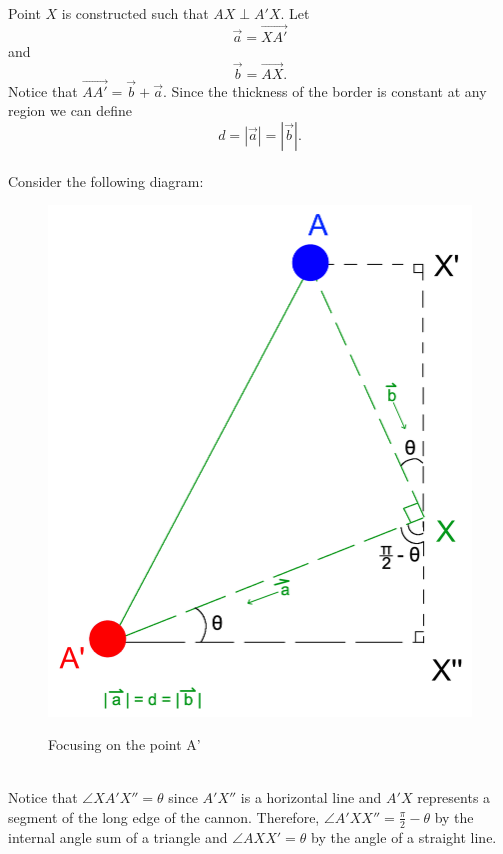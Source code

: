 \documentclass{article}
\begin{document}
Point $X$ is constructed such that $AX \perp A'X$. Let $$\vec{a} = \overrightarrow{XA'}$$ and $$\vec{b} = \overrightarrow{AX}.$$ Notice that $\overrightarrow{AA'} = \vec{b} + \vec{a}$. Since the thickness of the border is constant at any region we can define $$d = |\vec{a}| = |\vec{b}|.$$
\vspace{\baselineskip}\\
Consider the following diagram:\\
\begin{figure}[h]
	\centering
	\includegraphics[scale=0.2]{FindingOuterCornersOfCannon_2.png}\\
	\caption{Focusing on the point A'}
\end{figure}\\
Notice that $\angle XA'X'' = \theta$ since $A'X''$ is a horizontal line and $A'X$ represents a segment of the long edge of the cannon. Therefore, $\angle A'XX'' = \frac{\pi}{2} - \theta$ by the internal angle sum of a triangle and $\angle AXX' = \theta$ by the angle of a straight line. \vspace{\baselineskip}\\
\end{document}
